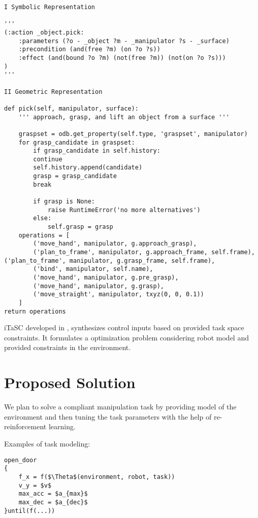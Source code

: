 \documentclass[thesis]{mas_proposal}
\begin{document}
\begin{lstlisting}[label=a-template,caption=Action Template: \_object.pick]
I Symbolic Representation 

'''
(:action _object.pick: 
	:parameters (?o - _object ?m - _manipulator ?s - _surface) 
	:precondition (and(free ?m) (on ?o ?s)) 
	:effect (and(bound ?o ?m) (not(free ?m)) (not(on ?o ?s)))
) 
''' 

II Geometric Representation

def pick(self, manipulator, surface):
	''' approach, grasp, and lift an object from a surface '''

	graspset = odb.get_property(self.type, 'graspset', manipulator) 
	for grasp_candidate in graspset: 
		if grasp_candidate in self.history: 
		continue
		self.history.append(candidate) 
		grasp = grasp_candidate 
		break

		if grasp is None: 
			raise RuntimeError('no more alternatives')
		else: 
			self.grasp = grasp
	operations = [
		('move_hand', manipulator, g.approach_grasp), 
		('plan_to_frame', manipulator, g.approach_frame, self.frame), ('plan_to_frame', manipulator, g.grasp_frame, self.frame), 
		('bind', manipulator, self.name), 
		('move_hand', manipulator, g.pre_grasp), 
		('move_hand', manipulator, g.grasp), 
		('move_straight', manipulator, txyz(0, 0, 0.1))
	] 
return operations
\end{lstlisting}

iTaSC developed in \cite{DeSchutter-ijrr2007, DecreBruyninckxDeSchutter2013, decre09}, synthesizes control inputs based on provided task space constraints. It formulates a optimization problem considering robot model and provided constraints in the environment. 


\chapter{Proposed Solution}

We plan to solve a compliant manipulation task by providing model of the environment and then tuning the task parameters with the help of re-reinforcement learning.

Examples of task modeling: 

\begin{lstlisting}[label=open_door_ts,caption=Task specification for opening door]
open_door
{
	f_x = f($\Theta$(environment, robot, task))
	v_y = $v$
	max_acc = $a_{max}$
	max_dec = $a_{dec}$
}until(f(...))

\end{lstlisting}
\end{document}
